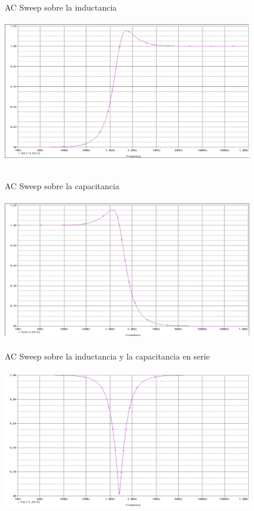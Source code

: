 \documentclass[12pt]{article}
\begin{document}
\begin{itemize}
		\noindent AC Sweep sobre la inductancia\\
		
		\includegraphics[width=11cm,height=7cm]{Img/Fuente_AC_RLC_AC_Sweep_L}
		
		\newpage
		
		\noindent AC Sweep sobre la capacitancia\\
		
		\includegraphics[width=11cm,height=7cm]{Img/Fuente_AC_RLC_AC_Sweep_C}\\
		
		\noindent AC Sweep sobre la inductancia y la capacitancia en serie\\
		
		\includegraphics[width=11cm,height=7cm]{Img/Fuente_AC_RLC_AC_Sweep_LC}\\
		

\end{itemize}
\end{document}

